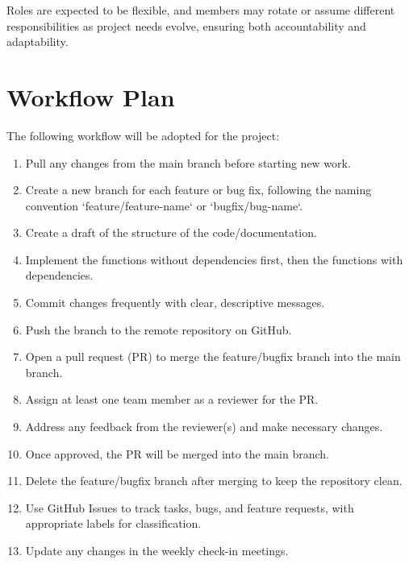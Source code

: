 \documentclass{article}
\begin{document}
\noindent
Roles are expected to be flexible, and members may rotate or assume different responsibilities as project needs evolve, ensuring both accountability and adaptability.

\section{Workflow Plan}

The following workflow will be adopted for the project:
\begin{enumerate}
  \item Pull any changes from the main branch before starting new work.
	\item Create a new branch for each feature or bug fix, following the naming convention `feature/feature-name` or `bugfix/bug-name`.
	\item Create a draft of the structure of the code/documentation.
	\item Implement the functions without dependencies first, then the functions with dependencies.
	\item Commit changes frequently with clear, descriptive messages.
	\item Push the branch to the remote repository on GitHub.
	\item Open a pull request (PR) to merge the feature/bugfix branch into the main branch.
	\item Assign at least one team member as a reviewer for the PR.
	\item Address any feedback from the reviewer(s) and make necessary changes.
	\item Once approved, the PR will be merged into the main branch.
	\item Delete the feature/bugfix branch after merging to keep the repository clean.
	\item Use GitHub Issues to track tasks, bugs, and feature requests, with appropriate labels for classification.
	\item Update any changes in the weekly check-in meetings.
\end{enumerate}
\end{document}

